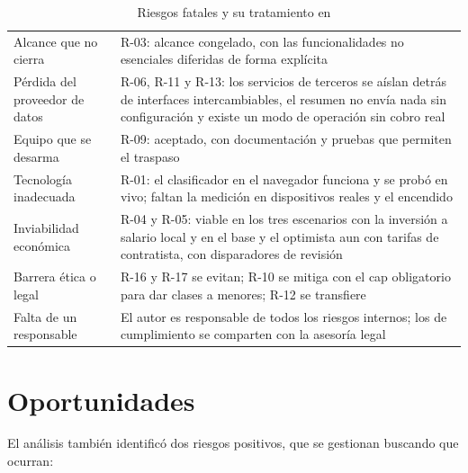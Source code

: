 \begin{table}[H]
    \centering
    \caption{Riesgos fatales y su tratamiento en \sistema{}}
    \label{tab:riesgos-fatales}
    \small
    \begin{tabularx}{\textwidth}{l L}
        \toprule
         &  \\
        \midrule
        Alcance que no cierra     & R-03: alcance congelado, con las funcionalidades no esenciales diferidas de forma explícita \\
        Pérdida del proveedor de datos & R-06, R-11 y R-13: los servicios de terceros se aíslan detrás de interfaces intercambiables, el resumen no envía nada sin configuración y existe un modo de operación sin cobro real \\
        Equipo que se desarma     & R-09: aceptado, con documentación y pruebas que permiten el traspaso \\
        Tecnología inadecuada     & R-01: el clasificador en el navegador funciona y se probó en vivo; faltan la medición en dispositivos reales y el encendido \\
        Inviabilidad económica    & R-04 y R-05: viable en los tres escenarios con la inversión a salario local y en el base y el optimista aun con tarifas de contratista, con disparadores de revisión \\
        Barrera ética o legal     & R-16 y R-17 se evitan; R-10 se mitiga con el \gls{cap} obligatorio para dar clases a menores; R-12 se transfiere \\
        Falta de un responsable   & El autor es responsable de todos los riesgos internos; los de cumplimiento se comparten con la asesoría legal \\
        \bottomrule
    \end{tabularx}
\end{table}

\section{Oportunidades}

El análisis también identificó dos riesgos positivos, que se gestionan
buscando que ocurran:

